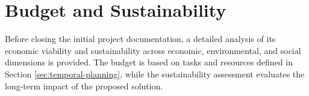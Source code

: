 \section{Budget and Sustainability}

Before closing the initial project documentation, a detailed analysis of its economic viability and sustainability across economic, environmental, and social dimensions is provided. The budget is based on tasks and resources defined in Section \ref{sec:temporal-planning}, while the sustainability assessment evaluates the long-term impact of the proposed solution.



